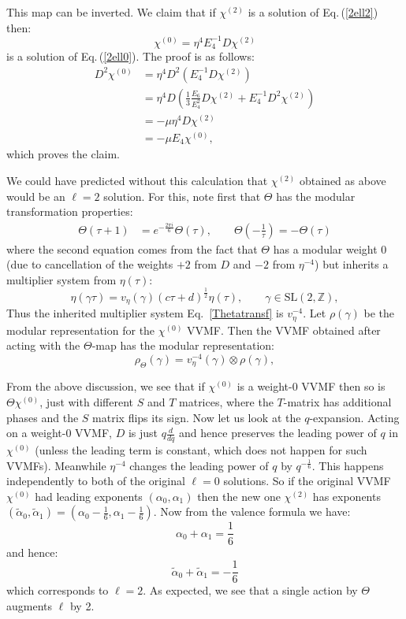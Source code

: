 \documentclass[11pt]{article}
\newcommand\be{\begin{equation}}
\newcommand\ee{\end{equation}}
\newcommand\talpha{{\tilde\alpha}}
\newcommand{\eref}[1]{Eq.\,(\ref{#1})}
\begin{document}
This map can be inverted. We claim that if $\chi^{(2)}$ is a solution of \eref{2ell2} then:
\be
\chi^{(0)} =\eta^4 E_4^{-1}D\chi^{(2)}
\ee
is a solution of \eref{2ell0}. The proof is as follows:
\be
\begin{split}
D^2\chi^{(0)} &=\eta^4D^2(E_4^{-1}D\chi^{(2)})\\
&= \eta^4 D\left(\frac13 \frac{E_6}{E_4^2}D\chi^{(2)}+E_4^{-1}D^2\chi^{(2)}\right)\\
&= -\mu\eta^4 D\chi^{(2)}\\
&= -\mu E_4\chi^{(0)},
\end{split}
\ee
which proves the claim.

We could have predicted without this calculation that $\chi^{(2)}$ obtained as above would be an $\ell=2$ solution. For this, note first that $\Theta$ has the modular transformation properties:
\be
\begin{split}
\Theta(\tau+1)&=e^{-\frac{2\pi i}{6}}\Theta(\tau), \qquad \Theta\left(-\frac{1}{\tau}\right)=-\Theta(\tau)
\end{split}
\label{Thetatransf}
\ee
where the second equation comes from the fact that $\Theta$ has a modular weight 0 (due to cancellation of the weights $+2$ from $D$ and $-2$ from $\eta^{-4}$) but inherits a multiplier system from $\eta(\tau)$:
\be
    \eta(\gamma\tau) = v_\eta(\gamma)(c\tau + d)^{\frac12}\eta(\tau), \qquad \gamma\in\text{SL}(2,\mathbb{Z}),
\label{eta-mod}
\ee
Thus the inherited multiplier system Eq.~\eqref{Thetatransf} is $v_\eta^{-4}$. Let $\rho(\gamma)$ be the modular representation for the $\chi^{(0)}$ VVMF. Then the VVMF obtained after acting with the $\Theta$-map has the modular representation:
\be
    \rho_\Theta(\gamma) = v_\eta^{-4}(\gamma)\otimes\rho(\gamma),
\ee

From the above discussion, we see that if $\chi^{(0)}$ is a weight-0 VVMF then so is $\Theta\chi^{(0)}$, just with different $S$ and $T$ matrices, where the $T$-matrix has additional phases and the $S$ matrix flips its sign. Now let us look at the $q$-expansion. Acting on a weight-0 VVMF, $D$ is just $q\frac{d}{dq}$ and hence preserves the leading power of $q$ in $\chi^{(0)}$ (unless the leading term is constant, which does not happen for such VVMFs).  Meanwhile $\eta^{-4}$ changes the leading power of $q$ by $q^{-\frac16}$. This happens independently to both of the original $\ell=0$ solutions. So if the original VVMF $\chi^{(0)}$ had leading exponents $(\alpha_0,\alpha_1)$ then the new one $\chi^{(2)}$ has exponents $(\talpha_0,\talpha_1)=(\alpha_0-\frac16,\alpha_1-\frac16)$. Now from the valence formula we have:
\be
\alpha_0+\alpha_1=\frac16
\ee
and hence:
\be
\talpha_0+\talpha_1=-\frac16
\ee
which corresponds to $\ell=2$. As expected, we see that a single action by $\Theta$ augments $\ell$ by 2.
\end{document}
